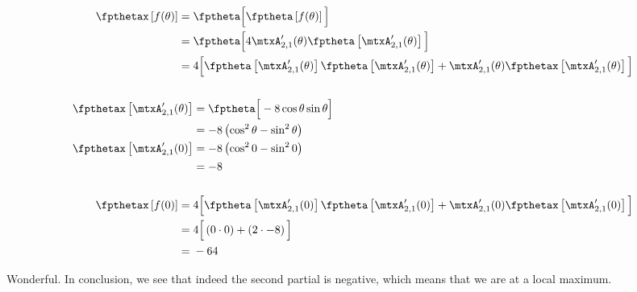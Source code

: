 \begin{equation*}
  \begin{split}
      \fpthetax \left[f(\theta)\right]
    ={}&
      \fptheta \Big[ \fptheta \left[f(\theta)\right] \Big] \\
    ={}&
      \fptheta \Big[
        4
        \mtxA'_{2, 1}(\theta)
        \fptheta \left[ \mtxA'_{2, 1}(\theta) \right]
      \Big] \\
    ={}&
      4 \Big[
        \fptheta \left[ \mtxA'_{2, 1}(\theta) \right]
        \fptheta \left[ \mtxA'_{2, 1}(\theta) \right]
        +
        \mtxA'_{2, 1}(\theta)
        \fpthetax \left[ \mtxA'_{2, 1}(\theta) \right]
      \Big] \\
    \\
      \fpthetax \left[ \mtxA'_{2, 1}(\theta) \right]
    &=
      \fptheta \Big[ -8 \cos\theta \sin\theta \Big] \\
    &= -8 \left( \cos^2\theta - \sin^2\theta \right) \\
      \fpthetax \left[ \mtxA'_{2, 1}(0) \right]
    &= -8 \left( \cos^2 0 - \sin^2 0 \right) \\
    &= -8 \\
    \\
      \fpthetax \left[f(0)\right]
    ={}&
      4 \Big[
        \fptheta \left[ \mtxA'_{2, 1}(0) \right]
        \fptheta \left[ \mtxA'_{2, 1}(0) \right]
        +
        \mtxA'_{2, 1}(0)
        \fpthetax \left[ \mtxA'_{2, 1}(0) \right]
      \Big] \\
    ={}&
      4 \Big[
        \left(0 \cdot 0\right)
        +
        \left(2 \cdot -8\right)
      \Big] \\
    ={}& -64
  \end{split}
\end{equation*}

Wonderful. In conclusion, we see that indeed the second partial is
negative, which means that we are at a local maximum.
